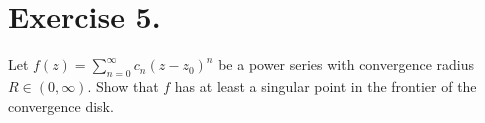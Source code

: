 
\section*{Exercise 5.}
Let $f(z) = \sum_{n = 0}^{\infty} c_n (z-z_0)^n$ be a power series with convergence radius $R \in (0,\infty)$. Show that $f$ has at least a singular point in the frontier of the convergence disk.

